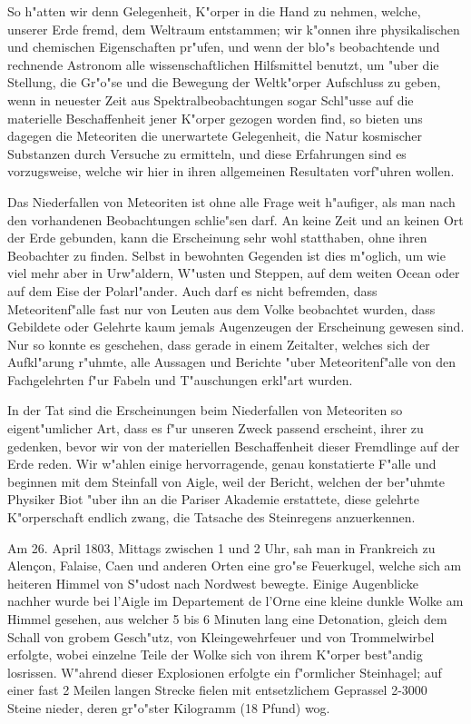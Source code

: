 \documentclass[a4paper, 11pt, oneside, german]{article}
\begin{document}
So h"atten wir denn Gelegenheit, K"orper in die Hand zu nehmen, welche, unserer Erde fremd, dem Weltraum entstammen; wir k"onnen ihre physikalischen und chemischen Eigenschaften pr"ufen, und wenn der blo"s beobachtende und rechnende Astronom alle wissenschaftlichen Hilfsmittel benutzt, um "uber die Stellung, die Gr"o"se und die Bewegung der Weltk"orper Aufschluss zu geben, wenn in neuester Zeit aus Spektralbeobachtungen sogar Schl"usse auf die materielle Beschaffenheit jener K"orper gezogen worden find, so bieten uns dagegen die Meteoriten die unerwartete Gelegenheit, die Natur kosmischer Substanzen durch Versuche zu ermitteln, und diese Erfahrungen sind es vorzugsweise, welche wir hier in ihren allgemeinen Resultaten vorf"uhren wollen.

Das Niederfallen von Meteoriten ist ohne alle Frage weit h"aufiger, als man nach den vorhandenen Beobachtungen schlie"sen darf. An keine Zeit und an keinen Ort der Erde gebunden, kann die Erscheinung sehr wohl statthaben, ohne ihren Beobachter zu finden. Selbst in bewohnten Gegenden ist dies m"oglich, um wie viel mehr aber in Urw"aldern, W"usten und Steppen, auf dem weiten Ocean oder auf dem Eise der Polarl"ander. Auch darf es nicht befremden, dass Meteoritenf"alle fast nur von Leuten aus dem Volke beobachtet wurden, dass Gebildete oder Gelehrte kaum jemals Augenzeugen der Erscheinung gewesen sind. Nur so konnte es geschehen, dass gerade in einem Zeitalter, welches sich der Aufkl"arung r"uhmte, alle Aussagen und Berichte "uber Meteoritenf"alle von den Fachgelehrten f"ur Fabeln und T"auschungen erkl"art wurden.

In der Tat sind die Erscheinungen beim Niederfallen von Meteoriten so eigent"umlicher Art, dass es f"ur unseren Zweck passend erscheint, ihrer zu gedenken, bevor wir von der materiellen Beschaffenheit dieser Fremdlinge auf der Erde reden. Wir w"ahlen einige hervorragende, genau konstatierte F"alle und beginnen mit dem Steinfall von Aigle, weil der Bericht, welchen der ber"uhmte Physiker Biot "uber ihn an die Pariser Akademie erstattete, diese gelehrte K"orperschaft endlich zwang, die Tatsache des Steinregens anzuerkennen.

Am 26. April 1803, Mittags zwischen 1 und 2 Uhr, sah man in Frankreich zu Alençon, Falaise, Caen und anderen Orten eine gro"se Feuerkugel, welche sich am heiteren Himmel von S"udost nach Nordwest bewegte. Einige Augenblicke nachher wurde bei l'Aigle im Departement de l'Orne eine kleine dunkle Wolke am Himmel gesehen, aus welcher 5 bis 6 Minuten lang eine Detonation, gleich dem Schall von grobem Gesch"utz, von Kleingewehrfeuer und von Trommelwirbel erfolgte, wobei einzelne Teile der Wolke sich von ihrem K"orper best"andig losrissen. W"ahrend dieser Explosionen erfolgte ein f"ormlicher Steinhagel; auf einer fast 2 Meilen langen Strecke fielen mit entsetzlichem Geprassel 2-3000 Steine nieder, deren gr"o"ster Kilogramm (18 Pfund) wog.
\end{document}
